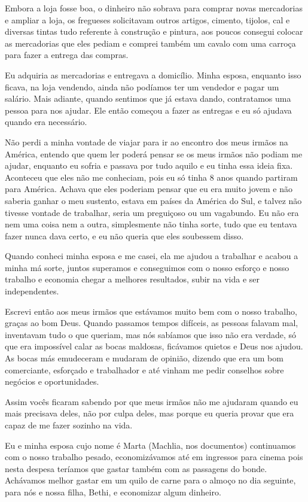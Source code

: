 Embora a loja fosse boa, o dinheiro não sobrava para comprar novas
mercadorias e ampliar a loja, os fregueses solicitavam outros artigos,
cimento, tijolos, cal e diversas tintas tudo referente à construção e
pintura, aos poucos consegui colocar as mercadorias que eles pediam e
comprei também um cavalo com uma carroça para fazer a entrega das
compras.

Eu adquiria as mercadorias e entregava a domicílio. Minha esposa,
enquanto isso ficava, na loja vendendo, ainda não podíamos ter um
vendedor e pagar um salário. Mais adiante, quando sentimos que já estava
dando, contratamos uma pessoa para nos ajudar. Ele então começou a fazer
as entregas e eu só ajudava quando era necessário.

Não perdi a minha vontade de viajar para ir ao encontro dos meus irmãos
na América, entendo que quem ler poderá pensar se os meus irmãos não
podiam me ajudar, enquanto eu sofria e passava por tudo aquilo e eu
tinha essa ideia fixa. Aconteceu que eles não me conheciam, pois eu só
tinha 8 anos quando partiram para América. Achava que eles poderiam
pensar que eu era muito jovem e não saberia ganhar o meu sustento,
estava em países da América do Sul, e talvez não tivesse vontade de
trabalhar, seria um preguiçoso ou um vagabundo. Eu não era nem uma coisa
nem a outra, simplesmente não tinha sorte, tudo que eu tentava fazer
nunca dava certo, e eu não queria que eles soubessem disso.

Quando conheci minha esposa e me casei, ela me ajudou a trabalhar e
acabou a minha má sorte, juntos superamos e conseguimos com o nosso
esforço e nosso trabalho e economia chegar a melhores resultados, subir
na vida e ser independentes.

Escrevi então aos meus irmãos que estávamos muito bem com o nosso
trabalho, graças ao bom Deus. Quando passamos tempos difíceis, as
pessoas falavam mal, inventavam tudo o que queriam, mas nós sabíamos que
isso não era verdade, só que era impossível calar as bocas maldosas,
ficávamos quietos e Deus nos ajudou. As bocas más emudeceram e mudaram
de opinião, dizendo que era um bom comerciante, esforçado e trabalhador
e até vinham me pedir conselhos sobre negócios e oportunidades.

Assim vocês ficaram sabendo por que meus irmãos não me ajudaram quando
eu mais precisava deles, não por culpa deles, mas porque eu queria
provar que era capaz de me fazer sozinho na vida.

Eu e minha esposa cujo nome é Marta (Machlia, nos documentos) continuamos
com o nosso trabalho pesado, economizávamos até em ingressos para cinema
pois nesta despesa teríamos que gastar também com as passagens do bonde.
Achávamos melhor gastar em um quilo de carne para o almoço no dia
seguinte, para nós e nossa filha, Bethi, e economizar algum dinheiro.

